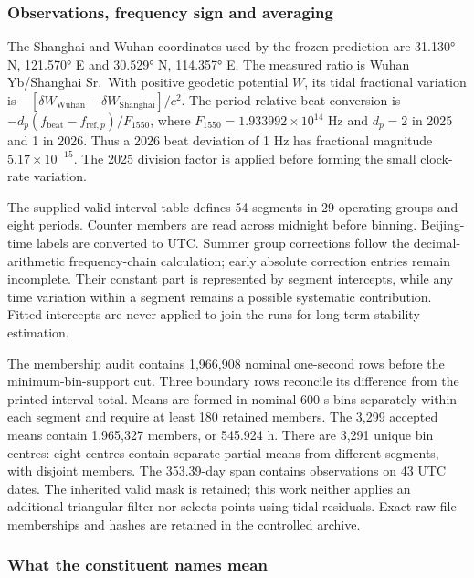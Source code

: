 \documentclass[
  12pt,
  a4paper,
]{article}
\begin{document}
\hypertarget{observations-frequency-sign-and-averaging}{%
\subsubsection{Observations, frequency sign and
averaging}\label{observations-frequency-sign-and-averaging}}

The Shanghai and Wuhan coordinates used by the frozen prediction are
31.130° N, 121.570° E and 30.529° N, 114.357° E. The measured ratio is
Wuhan Yb/Shanghai Sr.~With positive geodetic potential \(W\), its tidal
fractional variation is
\(-[\delta W_{\mathrm{Wuhan}}-\delta W_{\mathrm{Shanghai}}]/c^2\). The
period-relative beat conversion is
\(-d_p(f_{\mathrm{beat}}-f_{{\mathrm{ref}},p})/F_{1550}\), where
\(F_{1550}=1.933992\times10^{14}\) Hz and \(d_p=2\) in 2025 and 1 in
2026. Thus a 2026 beat deviation of 1 Hz has fractional magnitude
\(5.17\times10^{-15}\). The 2025 division factor is applied before
forming the small clock-rate variation.

The supplied valid-interval table defines 54 segments in 29 operating
groups and eight periods. Counter members are read across midnight
before binning. Beijing-time labels are converted to UTC. Summer group
corrections follow the decimal-arithmetic frequency-chain calculation;
early absolute correction entries remain incomplete. Their constant part
is represented by segment intercepts, while any time variation within a
segment remains a possible systematic contribution. Fitted intercepts
are never applied to join the runs for long-term stability estimation.

The membership audit contains 1,966,908 nominal one-second rows before
the minimum-bin-support cut. Three boundary rows reconcile its
difference from the printed interval total. Means are formed in nominal
600-s bins separately within each segment and require at least 180
retained members. The 3,299 accepted means contain 1,965,327 members, or
545.924 h. There are 3,291 unique bin centres: eight centres contain
separate partial means from different segments, with disjoint members.
The 353.39-day span contains observations on 43 UTC dates. The inherited
valid mask is retained; this work neither applies an additional
triangular filter nor selects points using tidal residuals. Exact
raw-file memberships and hashes are retained in the controlled archive.

\hypertarget{what-the-constituent-names-mean}{%
\subsubsection{What the constituent names
mean}\label{what-the-constituent-names-mean}}
\end{document}
